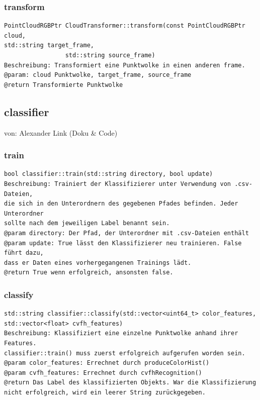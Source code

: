 \documentclass{suturo}
\makeatletter
\newcommand{\chapterauthor}[1]{%
  {\parindent0pt\vspace*{-27pt}%
  \linespread{0}\small\begin{flushright}von: #1\end{flushright}%
  \par\nobreak\vspace*{0pt}}
  \@afterheading%
}
\makeatother
\begin{document}
\subsubsection{transform}
\begin{verbatim}
PointCloudRGBPtr CloudTransformer::transform(const PointCloudRGBPtr cloud,
std::string target_frame,
                 std::string source_frame)
Beschreibung: Transformiert eine Punktwolke in einen anderen frame.
@param: cloud Punktwolke, target_frame, source_frame
@return Transformierte Punktwolke
\end{verbatim}\label{func:transform}

\subsection*{classifier}
\chapterauthor {Alexander Link (Doku \& Code)}

\subsubsection{train}
\begin{verbatim}
bool classifier::train(std::string directory, bool update)
Beschreibung: Trainiert der Klassifizierer unter Verwendung von .csv-Dateien,
die sich in den Unterordnern des gegebenen Pfades befinden. Jeder Unterordner
sollte nach dem jeweiligen Label benannt sein.
@param directory: Der Pfad, der Unterordner mit .csv-Dateien enthält
@param update: True lässt den Klassifizierer neu trainieren. False führt dazu,
dass er Daten eines vorhergegangenen Trainings lädt.
@return True wenn erfolgreich, ansonsten false.
\end{verbatim}\label{func:train}

\subsubsection{classify}
\begin{verbatim}
std::string classifier::classify(std::vector<uint64_t> color_features,
std::vector<float> cvfh_features)
Beschreibung: Klassifiziert eine einzelne Punktwolke anhand ihrer Features.
classifier::train() muss zuerst erfolgreich aufgerufen worden sein.
@param color_features: Errechnet durch produceColorHist()
@param cvfh_features: Errechnet durch cvfhRecognition()
@return Das Label des klassifizierten Objekts. War die Klassifizierung
nicht erfolgreich, wird ein leerer String zurückgegeben.
\end{verbatim}\label{func:classify}
\end{document}
